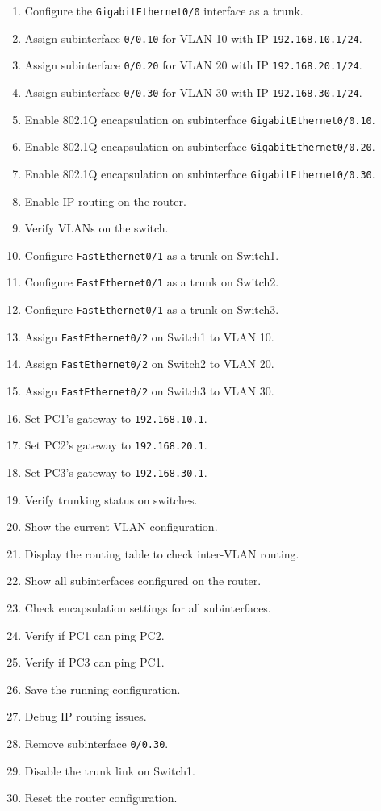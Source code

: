 \documentclass[a4paper]{book}
\begin{document}
\begin{enumerate}
    \item Configure the \texttt{GigabitEthernet0/0} interface as a trunk.
    \item Assign subinterface \texttt{0/0.10} for VLAN 10 with IP \texttt{192.168.10.1/24}.
    \item Assign subinterface \texttt{0/0.20} for VLAN 20 with IP \texttt{192.168.20.1/24}.
    \item Assign subinterface \texttt{0/0.30} for VLAN 30 with IP \texttt{192.168.30.1/24}.
    \item Enable 802.1Q encapsulation on subinterface \texttt{GigabitEthernet0/0.10}.
    \item Enable 802.1Q encapsulation on subinterface \texttt{GigabitEthernet0/0.20}.
    \item Enable 802.1Q encapsulation on subinterface \texttt{GigabitEthernet0/0.30}.
    \item Enable IP routing on the router.
    \item Verify VLANs on the switch.
    \item Configure \texttt{FastEthernet0/1} as a trunk on Switch1.
    \item Configure \texttt{FastEthernet0/1} as a trunk on Switch2.
    \item Configure \texttt{FastEthernet0/1} as a trunk on Switch3.
    \item Assign \texttt{FastEthernet0/2} on Switch1 to VLAN 10.
    \item Assign \texttt{FastEthernet0/2} on Switch2 to VLAN 20.
    \item Assign \texttt{FastEthernet0/2} on Switch3 to VLAN 30.
    \item Set PC1's gateway to \texttt{192.168.10.1}.
    \item Set PC2's gateway to \texttt{192.168.20.1}.
    \item Set PC3's gateway to \texttt{192.168.30.1}.
    \item Verify trunking status on switches.
    \item Show the current VLAN configuration.
    \item Display the routing table to check inter-VLAN routing.
    \item Show all subinterfaces configured on the router.
    \item Check encapsulation settings for all subinterfaces.
    \item Verify if PC1 can ping PC2.
    \item Verify if PC3 can ping PC1.
    \item Save the running configuration.
    \item Debug IP routing issues.
    \item Remove subinterface \texttt{0/0.30}.
    \item Disable the trunk link on Switch1.
    \item Reset the router configuration.
\end{enumerate}
\end{document}
